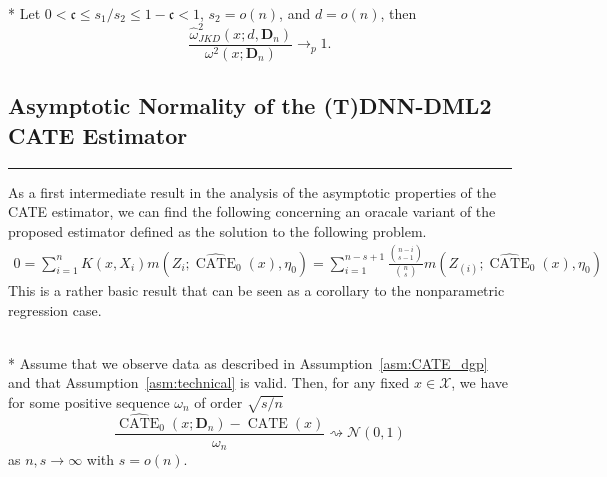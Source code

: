 \begin{boxD}
	\begin{thm}\label{thm:JKD_Cons}\mbox{}\\*
		Let $0 < \mathfrak{c} \leq s_1/s_2 \leq 1 - \mathfrak{c} < 1$, $s_2 = o(n)$, and $d = o(n)$, then
		\begin{equation}
			\frac{\hat{\omega}_{JKD}^2\left(x; d, \mathbf{D}_n\right)}{\omega^{2}\left(x; \mathbf{D}_n\right)} \longrightarrow_{p} 1.
		\end{equation}
	\end{thm}
\end{boxD}

\newpage
\subsection{Asymptotic Normality of the (T)DNN-DML2 CATE Estimator}\label{CATE_AsympNorm}
\hrule

As a first intermediate result in the analysis of the asymptotic properties of the CATE estimator, we can find the following concerning an oracale variant of the proposed estimator defined as the solution to the following problem.
\begin{equation}
    \begin{aligned}
        0 
        = \sum_{i = 1}^{n} K(x, X_{i}) m\left(Z_{i}; \widehat{\operatorname{CATE}}_{0}(x), \eta_{0}\right)
        = \sum_{i = 1}^{n - s + 1} \frac{\binom{n-i}{s-1}}{\binom{n}{s}} m\left(Z_{(i)}; \widehat{\operatorname{CATE}}_{0}(x),\eta_{0}\right)
    \end{aligned}
\end{equation}
This is a rather basic result that can be seen as a corollary to the nonparametric regression case.
\begin{boxD}
	\begin{thm}\label{thm:DNNDML2_anorm_0}\mbox{}\\*
		Assume that we observe data as described in Assumption~\ref{asm:CATE_dgp} and that Assumption~\ref{asm:technical} is valid.
		Then, for any fixed $x \in \mathcal{X}$, we have for some positive sequence $\omega_n$ of order $\sqrt{s/n}$
		\begin{equation}
			\frac{\widehat{\operatorname{CATE}}_{0}(x; \mathbf{D}_n) - \operatorname{CATE}(x)}{\omega_n}
			\rightsquigarrow \mathcal{N}\left(0,1\right)
		\end{equation}
		as $n,s \rightarrow \infty$ with $s = o(n)$.
	\end{thm}
\end{boxD}

